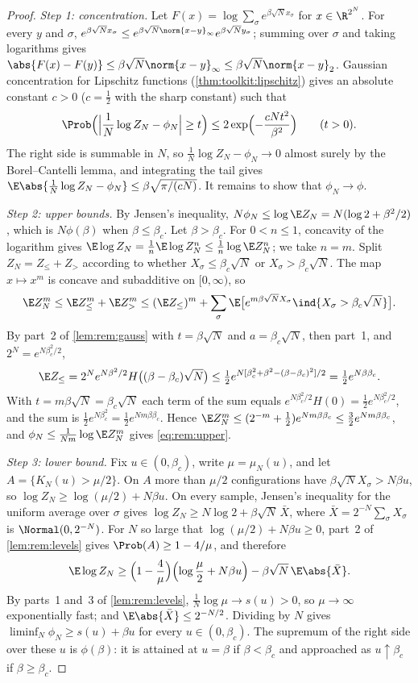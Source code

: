 \begin{refsection}
\begin{proof}
\emph{Step 1: concentration.} Let $F(x)=\log\sum_\sigma e^{\beta\sqrt Nx_\sigma}$ for $x\in\R^{2^N}$. For every $y$ and $\sigma$, $e^{\beta\sqrt Nx_\sigma}\le e^{\beta\sqrt N\norm{x-y}_\infty}e^{\beta\sqrt Ny_\sigma}$; summing over $\sigma$ and taking logarithms gives $\abs{F(x)-F(y)}\le\beta\sqrt N\norm{x-y}_\infty\le\beta\sqrt N\norm{x-y}_2$. Gaussian concentration for Lipschitz functions (\cref{thm:toolkit:lipschitz}) gives an absolute constant $c>0$ ($c=\frac12$ with the sharp constant) such that
\[
\Prob\Bigl(\Bigl|\frac1N\log Z_N-\phi_N\Bigr|\ge t\Bigr)\le2\exp\Bigl(-\frac{cNt^2}{\beta^2}\Bigr)\qquad(t>0).
\]
The right side is summable in $N$, so $\frac1N\log Z_N-\phi_N\to0$ almost surely by the Borel--Cantelli lemma, and integrating the tail gives $\E\abs{\frac1N\log Z_N-\phi_N}\le\beta\sqrt{\pi/(cN)}$. It remains to show that $\phi_N\to\phi$.

\emph{Step 2: upper bounds.} By Jensen's inequality, $N\phi_N\le\log\E Z_N=N(\log2+\beta^2/2)$, which is $N\phi(\beta)$ when $\beta\le\beta_c$. Let $\beta>\beta_c$. For $0<n\le1$, concavity of the logarithm gives $\E\log Z_N=\frac1n\E\log Z_N^n\le\frac1n\log\E Z_N^n$; we take $n=m$. Split $Z_N=Z_\le+Z_>$ according to whether $X_\sigma\le\beta_c\sqrt N$ or $X_\sigma>\beta_c\sqrt N$. The map $x\mapsto x^m$ is concave and subadditive on $[0,\infty)$, so
\[
\E Z_N^m\le\E Z_\le^m+\E Z_>^m\le(\E Z_\le)^m+\sum_\sigma\E\bigl[e^{m\beta\sqrt NX_\sigma}\ind\{X_\sigma>\beta_c\sqrt N\}\bigr].
\]
By part~2 of \cref{lem:rem:gauss} with $t=\beta\sqrt N$ and $a=\beta_c\sqrt N$, then part~1, and $2^N=e^{N\beta_c^2/2}$,
\[
\E Z_\le=2^Ne^{N\beta^2/2}H\bigl((\beta-\beta_c)\sqrt N\bigr)\le\tfrac12e^{N[\beta_c^2+\beta^2-(\beta-\beta_c)^2]/2}=\tfrac12e^{N\beta\beta_c}.
\]
With $t=m\beta\sqrt N=\beta_c\sqrt N$ each term of the sum equals $e^{N\beta_c^2/2}H(0)=\frac12e^{N\beta_c^2/2}$, and the sum is $\frac12e^{N\beta_c^2}=\frac12e^{Nm\beta\beta_c}$. Hence $\E Z_N^m\le(2^{-m}+\frac12)e^{Nm\beta\beta_c}\le\frac32e^{Nm\beta\beta_c}$, and $\phi_N\le\frac1{Nm}\log\E Z_N^m$ gives \eqref{eq:rem:upper}.

\emph{Step 3: lower bound.} Fix $u\in(0,\beta_c)$, write $\mu=\mu_N(u)$, and let $A=\{K_N(u)>\mu/2\}$. On $A$ more than $\mu/2$ configurations have $\beta\sqrt NX_\sigma>N\beta u$, so $\log Z_N\ge\log(\mu/2)+N\beta u$. On every sample, Jensen's inequality for the uniform average over $\sigma$ gives $\log Z_N\ge N\log2+\beta\sqrt N\,\bar X$, where $\bar X=2^{-N}\sum_\sigma X_\sigma$ is $\Normal(0,2^{-N})$. For $N$ so large that $\log(\mu/2)+N\beta u\ge0$, part~2 of \cref{lem:rem:levels} gives $\Prob(A)\ge1-4/\mu$, and therefore
\[
\E\log Z_N\ge\Bigl(1-\frac4\mu\Bigr)\Bigl(\log\frac\mu2+N\beta u\Bigr)-\beta\sqrt N\,\E\abs{\bar X}.
\]
By parts~1 and~3 of \cref{lem:rem:levels}, $\frac1N\log\mu\to s(u)>0$, so $\mu\to\infty$ exponentially fast; and $\E\abs{\bar X}\le2^{-N/2}$. Dividing by $N$ gives $\liminf_N\phi_N\ge s(u)+\beta u$ for every $u\in(0,\beta_c)$. The supremum of the right side over these $u$ is $\phi(\beta)$: it is attained at $u=\beta$ if $\beta<\beta_c$ and approached as $u\uparrow\beta_c$ if $\beta\ge\beta_c$.


\end{proof}
\end{refsection}
